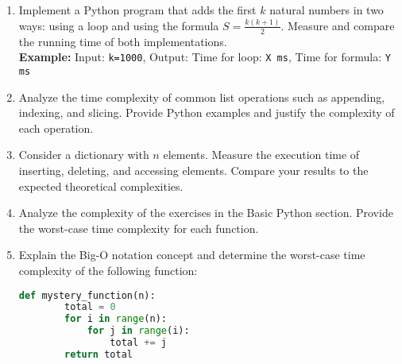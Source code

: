 \documentclass{article}
\begin{document}
\begin{enumerate}
    \item Implement a Python program that adds the first \( k \) natural numbers in two ways: using a loop and using the formula \( S = \frac{k(k+1)}{2} \). Measure and compare the running time of both implementations.\\
    \textbf{Example:} Input: \texttt{k=1000}, Output: Time for loop: \texttt{X ms}, Time for formula: \texttt{Y ms}
    
    \item Analyze the time complexity of common list operations such as appending, indexing, and slicing. Provide Python examples and justify the complexity of each operation.
    
    \item Consider a dictionary with \( n \) elements. Measure the execution time of inserting, deleting, and accessing elements. Compare your results to the expected theoretical complexities.
    
    \item Analyze the complexity of the exercises in the Basic Python section. Provide the worst-case time complexity for each function.
    
    \item Explain the Big-O notation concept and determine the worst-case time complexity of the following function:
    \begin{lstlisting}[language=Python]
    def mystery_function(n):
        total = 0
        for i in range(n):
            for j in range(i):
                total += j
        return total
    \end{lstlisting}
\end{enumerate}
\end{document}
